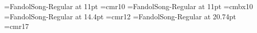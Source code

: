 %
%



\font\tenrm=FandolSong-Regular at 11pt
\ifx\tenrm\nullfont \font\tenrm=cmr10 \fi
\font\tenbf=FandolSong-Regular at 11pt
\ifx\tenbf\nullfont \font\tenbf=cmbx10 \fi
\font\tenlrg=FandolSong-Regular at 14.4pt
\ifx\tenlrg\nullfont \font\tenlrg=cmr12 \fi
\font\tenhuge=FandolSong-Regular at 20.74pt
\ifx\tenhuge\nullfont \font\tenhuge=cmr17 \fi
\tenrm

\def\large{\tenlrg}
\def\huge{\tenhuge}
\newdimen\itemindent
\long\def\pagestyle=#1\par{\relax}


